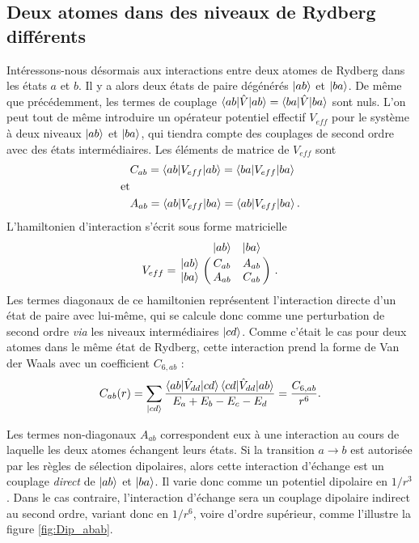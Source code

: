 \subsection{Deux atomes dans des niveaux de Rydberg différents}
\label{subsec:interaction_diff_levels}
Intéressons-nous désormais aux interactions entre deux atomes de Rydberg dans les états $a$ et $b$.
Il y a alors deux états de paire dégénérés $\ket{ab}$ et $\ket{ba}$.
De même que précédemment, les termes de couplage $\braket{ab|\hat{V}|ab}=\braket{ba|\hat{V}|ba}$ sont nuls.
L'on peut tout de même introduire un opérateur potentiel effectif $V_{eff}$ pour le système à deux niveaux $\ket{ab}$ et $\ket{ba}$, qui tiendra compte des couplages de second ordre avec des états intermédiaires.
Les éléments de matrice de $V_{eff}$ sont
%
\begin{equation}\label{eq:Cab_Aab}
\begin{aligned}
&C_{ab}=\braket{ab|V_{eff}|ab}=\braket{ba|V_{eff}|ba} \\
\text{et} &\\
&A_{ab}=\braket{ab|V_{eff}|ba}=\braket{ab|V_{eff}|ba}.
\end{aligned}
\end{equation}
%
L'hamiltonien d'interaction s'écrit sous forme matricielle
\begin{equation}\label{eq:MatrixCab_Aab}
V_{eff} = \bordermatrix{~ 	&\ket{ab} 	& \ket{ba} \cr
	\ket{ab}		&C_{ab} 		&A_{ab}	\cr 
	\ket{ba} 		&A_{ab} 		&C_{ab} \cr} \ .
\end{equation}
%
Les termes diagonaux de ce hamiltonien représentent l'interaction directe d'un état de paire avec lui-même, qui se calcule donc comme une perturbation de second ordre \textit{via} les niveaux intermédiaires $\ket{cd}$.
Comme c'était le cas pour deux atomes dans le même état de Rydberg, cette interaction prend la forme de Van der Waals avec un coefficient $C_{6,ab}$ :
\begin{equation}\label{eq:VdW_abab}
C_{ab}(r)=\sum_{\ket{cd}}{\frac{\braket{ab|\hat{V}_{dd}|cd}\braket{cd|\hat{V}_{dd}|ab}}{E_a + E_b - E_c - E_d}}  = \frac{C_{6,ab}}{r^6}.
\end{equation}

Les termes non-diagonaux $A_{ab}$ correspondent eux à une interaction au cours de laquelle les deux atomes échangent leurs états.
Si la transition $a\rightarrow b$ est autorisée par les règles de sélection dipolaires, alors cette interaction d'échange est un couplage \textit{direct} de $\ket{ab}$ et $\ket{ba}$.
Il varie donc comme un potentiel dipolaire en $1/r^3$.
Dans le cas contraire, l'interaction d'échange sera un couplage dipolaire indirect au second ordre, variant donc en $1/r^6$, voire d'ordre supérieur, comme l'illustre la figure \eqref{fig:Dip_abab}.

